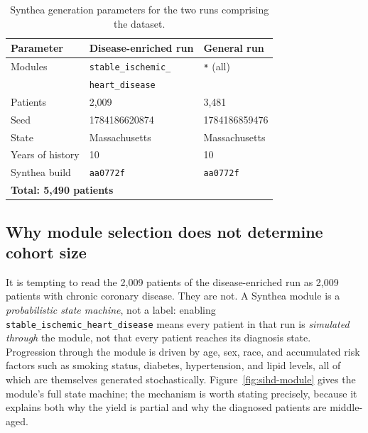 \begin{table}[h]
\centering
\caption{Synthea generation parameters for the two runs comprising the dataset.}
\label{tab:generation}
\begin{tabular}{lll}
\hline
\textbf{Parameter} & \textbf{Disease-enriched run} & \textbf{General run} \\
\hline
Modules            & \texttt{stable\_ischemic\_} & \texttt{*} (all) \\
                   & \texttt{heart\_disease} & \\
Patients           & 2{,}009 & 3{,}481 \\
Seed               & 1784186620874 & 1784186859476 \\
State              & Massachusetts & Massachusetts \\
Years of history   & 10 & 10 \\
Synthea build      & \texttt{aa0772f} & \texttt{aa0772f} \\
\hline
\multicolumn{3}{l}{\textbf{Total: 5{,}490 patients}} \\
\hline
\end{tabular}
\end{table}

\subsection{Why module selection does not determine cohort size}
\label{sec:module-yield}
It is tempting to read the 2{,}009 patients of the disease-enriched run as 2{,}009 patients
with chronic coronary disease. They are not. A Synthea module is a \emph{probabilistic
state machine}, not a label: enabling
\texttt{stable\_ischemic\_heart\_disease} means every patient in that run is
\emph{simulated through} the module, not that every patient reaches its diagnosis state.
Progression through the module is driven by age, sex, race, and accumulated risk factors such
as smoking status, diabetes, hypertension, and lipid levels, all of which are themselves
generated stochastically. Figure~\ref{fig:sihd-module} gives the module's full state machine;
the mechanism is worth stating precisely, because it explains both why the yield is partial
and why the diagnosed patients are middle-aged.

